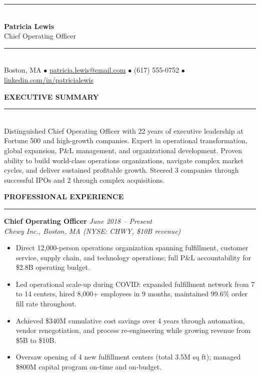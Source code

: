 \documentclass[11pt,a4paper]{article}
\begin{document}
\begin{center}
  \rule{\textwidth}{1.5pt}\\[5pt]
  {\LARGE \textbf{Patricia Lewis}}\\[3pt]
  {\large Chief Operating Officer}\\[5pt]
  \rule{\textwidth}{1.5pt}\\[3pt]
  Boston, MA \quad$\bullet$\quad
  \href{mailto:patricia.lewis@email.com}{patricia.lewis@email.com} \quad$\bullet$\quad
  (617) 555-0752 \quad$\bullet$\quad
  \href{https://linkedin.com/in/patricialewis}{linkedin.com/in/patricialewis}
\end{center}

\vspace{8pt}

\noindent\textbf{EXECUTIVE SUMMARY}\\
\noindent\rule{\textwidth}{0.4pt}\\[3pt]
Distinguished Chief Operating Officer with 22 years of executive leadership at Fortune 500 and high-growth companies. Expert in operational transformation, global expansion, P\&L management, and organizational development. Proven ability to build world-class operations organizations, navigate complex market cycles, and deliver sustained profitable growth. Steered 3 companies through successful IPOs and 2 through complex acquisitions.

\vspace{8pt}
\noindent\textbf{PROFESSIONAL EXPERIENCE}\\
\noindent\rule{\textwidth}{0.4pt}

\vspace{3pt}
\noindent\textbf{Chief Operating Officer} \hfill \textit{June 2018 -- Present}\\
\textit{Chewy Inc., Boston, MA \quad (NYSE: CHWY, \$10B revenue)}
\begin{itemize}
  \item Direct 12,000-person operations organization spanning fulfillment, customer service, supply chain, and technology operations; full P\&L accountability for \$2.8B operating budget.
  \item Led operational scale-up during COVID: expanded fulfillment network from 7 to 14 centers, hired 8,000+ employees in 9 months, maintained 99.6\% order fill rate throughout.
  \item Achieved \$340M cumulative cost savings over 4 years through automation, vendor renegotiation, and process re-engineering while growing revenue from \$5B to \$10B.
  \item Oversaw opening of 4 new fulfillment centers (total 3.5M sq ft); managed \$800M capital program on-time and on-budget.
\end{itemize}
\end{document}
